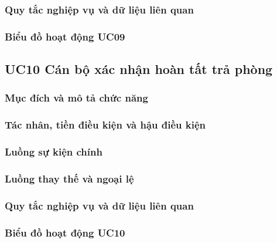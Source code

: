 \subsubsection{Quy tắc nghiệp vụ và dữ liệu liên quan}


\subsubsection{Biểu đồ hoạt động UC09}


\subsection{UC10 Cán bộ xác nhận hoàn tất trả phòng}

\subsubsection{Mục đích và mô tả chức năng}


\subsubsection{Tác nhân, tiền điều kiện và hậu điều kiện}


\subsubsection{Luồng sự kiện chính}


\subsubsection{Luồng thay thế và ngoại lệ}


\subsubsection{Quy tắc nghiệp vụ và dữ liệu liên quan}


\subsubsection{Biểu đồ hoạt động UC10}


